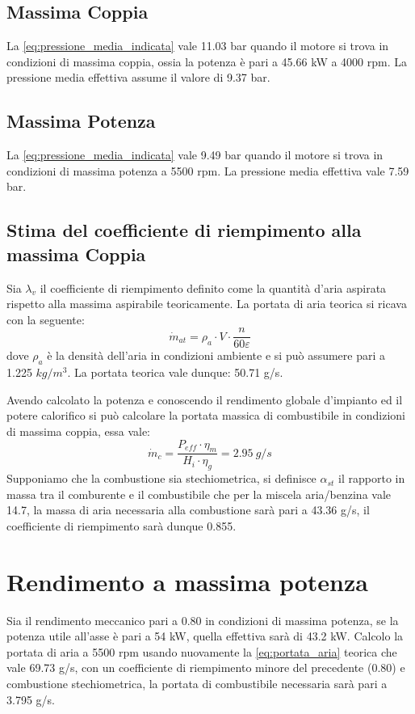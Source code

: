 \documentclass[a4paper,12pt]{article}
\begin{document}
\subsection{Massima Coppia}
La \eqref{eq:pressione_media_indicata} vale 11.03 bar quando il motore si trova in condizioni di massima coppia, ossia la potenza è pari a 45.66 kW a 4000 rpm.
La pressione media effettiva assume il valore di 9.37 bar.
\subsection{Massima Potenza}
La \eqref{eq:pressione_media_indicata} vale 9.49 bar quando il motore si trova in condizioni di massima potenza a 5500 rpm.
La pressione media effettiva vale 7.59 bar.

\subsection{Stima del coefficiente di riempimento alla massima Coppia}
Sia $\lambda_v$ il coefficiente di riempimento definito come la quantità d'aria aspirata rispetto alla massima aspirabile teoricamente.
La portata di aria teorica si ricava con la seguente:
\begin{equation}
    \label{eq:portata_aria}
    \dot m_{at} = \rho_a \cdot V \cdot \frac{n}{60\varepsilon}
\end{equation}
dove $\rho_a$ è la densità dell'aria in condizioni ambiente e si può assumere pari a 1.225 $kg/m^3$.
La portata teorica vale dunque: 50.71 g/s.

Avendo calcolato la potenza e conoscendo il rendimento globale d'impianto ed il potere calorifico si può calcolare la portata massica di combustibile in condizioni di massima
coppia, essa vale: 
\begin{equation}
    \dot m_c = \frac{P_{eff}\cdot \eta_m}{H_i\cdot \eta_g} = 2.95\ g/s
\end{equation}
Supponiamo che la combustione sia stechiometrica, si definisce $\alpha_{st}$ il rapporto in massa tra il comburente e il combustibile che per la miscela aria/benzina
vale 14.7, la massa di aria necessaria alla combustione sarà pari a 43.36 g/s, il coefficiente di riempimento sarà dunque 0.855.

\section{Rendimento a massima potenza}
Sia il rendimento meccanico pari a 0.80 in condizioni di massima potenza, se la potenza utile all'asse è pari a 54 kW, quella effettiva sarà di 43.2 kW.
Calcolo la portata di aria a 5500 rpm usando nuovamente la \eqref{eq:portata_aria} teorica che vale 69.73 g/s, con un coefficiente di riempimento minore del precedente (0.80)
e combustione stechiometrica, la portata di combustibile necessaria sarà pari a 3.795 g/s.
\end{document}
